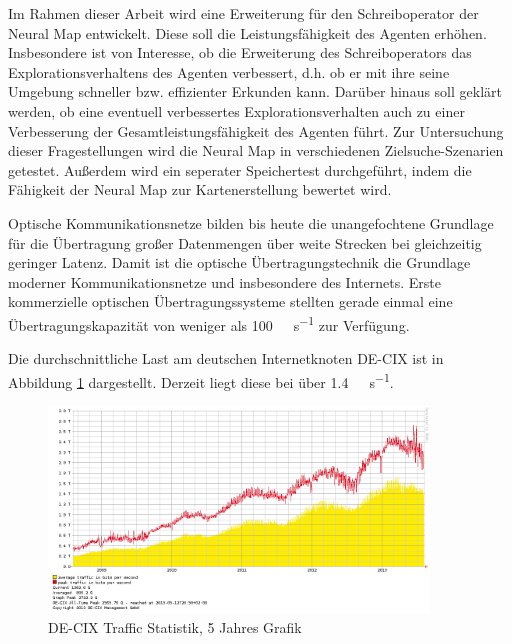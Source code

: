 Im Rahmen dieser Arbeit wird eine Erweiterung für den Schreiboperator der Neural Map entwickelt. Diese soll die Leistungsfähigkeit des Agenten erhöhen. Insbesondere ist von Interesse, ob die Erweiterung des Schreiboperators das Explorationsverhaltens des Agenten verbessert, d.h. ob er mit ihre seine Umgebung schneller bzw. effizienter Erkunden kann. Darüber hinaus soll geklärt werden, ob eine eventuell verbessertes Explorationsverhalten auch zu einer Verbesserung der Gesamtleistungsfähigkeit des Agenten führt. Zur Untersuchung dieser Fragestellungen wird die Neural Map in verschiedenen Zielsuche-Szenarien getestet. Außerdem wird ein seperater Speichertest durchgeführt, indem die Fähigkeit der Neural Map zur Kartenerstellung bewertet wird.











\iffalse



Optische Kommunikationsnetze bilden bis heute die unangefochtene Grundlage für die Übertragung großer Datenmengen über weite Strecken bei gleichzeitig geringer Latenz.
Damit ist die optische Übertragungstechnik die Grundlage moderner Kommunikationsnetze und insbesondere des Internets.
Erste kommerzielle optischen Übertragungssysteme stellten gerade einmal eine Übertragungskapazität von weniger als \SI{100}{\mega\bit\per\second} zur Verfügung.\par\medskip
Die durchschnittliche Last am deutschen Internetknoten DE-CIX ist in Abbildung \ref{fig:DE-CIX} dargestellt. Derzeit liegt diese bei über \SI{1,4}{\tera\bit\per\second}.

\begin{figure}[ht!]
 \centering
 \includegraphics[keepaspectratio,width=0.9\textwidth]{abbildungen/de-cix_5y_20130804.png}
 \caption{DE-CIX Traffic Statistik, 5 Jahres Grafik \protect\footnotemark[1]}
 \label{fig:DE-CIX}
\end{figure}

